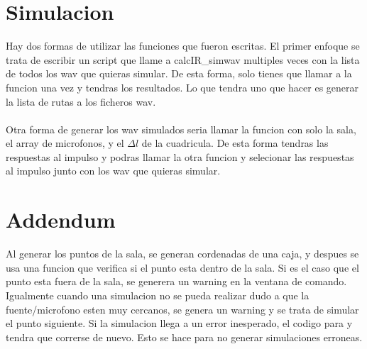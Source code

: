 \documentclass{article}
\begin{document}
\section{Simulacion}
Hay dos formas de utilizar las funciones que fueron escritas. El primer enfoque se trata de escribir un script que llame a calcIR\_simwav multiples veces con la lista de todos los wav que quieras simular. De esta forma, solo tienes que llamar a la funcion una vez y tendras los resultados. Lo que tendra uno que hacer es generar la lista de rutas a los ficheros wav.\\\\
Otra forma de generar los wav simulados seria llamar la funcion con solo la sala, el array de microfonos, y el $\Delta l$ de la cuadricula. De esta forma tendras las respuestas al impulso y podras llamar la otra funcion y selecionar las respuestas al impulso junto con los wav que quieras simular. 

\section{Addendum}
Al generar los puntos de la sala, se generan cordenadas de una caja, y despues se usa una funcion que verifica si el punto esta dentro de la sala. Si es el caso que el punto esta fuera de la sala, se generera un warning en la ventana de comando. Igualmente cuando una simulacion no se pueda realizar dudo a que la fuente/microfono esten muy cercanos, se genera un warning y se trata de simular el punto siguiente. Si la simulacion llega a un error inesperado, el codigo para y tendra que correrse de nuevo. Esto se hace para no generar simulaciones erroneas.  
\end{document}
